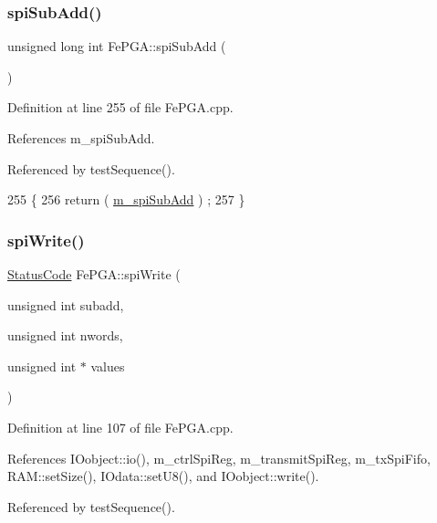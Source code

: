 \subsubsection{\texorpdfstring{spi\+Sub\+Add()}{spiSubAdd()}}
{\footnotesize\ttfamily unsigned long int Fe\+P\+G\+A\+::spi\+Sub\+Add (\begin{DoxyParamCaption}{ }\end{DoxyParamCaption})}



Definition at line 255 of file Fe\+P\+G\+A.\+cpp.



References m\+\_\+spi\+Sub\+Add.



Referenced by test\+Sequence().


\begin{DoxyCode}
255                                   \{
256   \textcolor{keywordflow}{return} ( \hyperlink{classFePGA_a4f2f5d175aeb6dcaf497f81d2f075411}{m\_spiSubAdd} ) ;
257 \}
\end{DoxyCode}
\mbox{\label{classFePGA_ac3e8b10fc267b44fef1e651cab77d2ab}} 
\subsubsection{\texorpdfstring{spi\+Write()}{spiWrite()}\hspace{0.1cm}{\footnotesize\ttfamily [1/3]}}
{\footnotesize\ttfamily \hyperlink{classStatusCode}{Status\+Code} Fe\+P\+G\+A\+::spi\+Write (\begin{DoxyParamCaption}\item[{unsigned int}]{subadd,  }\item[{unsigned int}]{nwords,  }\item[{unsigned int $\ast$}]{values }\end{DoxyParamCaption})}



Definition at line 107 of file Fe\+P\+G\+A.\+cpp.



References I\+Oobject\+::io(), m\+\_\+ctrl\+Spi\+Reg, m\+\_\+transmit\+Spi\+Reg, m\+\_\+tx\+Spi\+Fifo, R\+A\+M\+::set\+Size(), I\+Odata\+::set\+U8(), and I\+Oobject\+::write().



Referenced by test\+Sequence().



